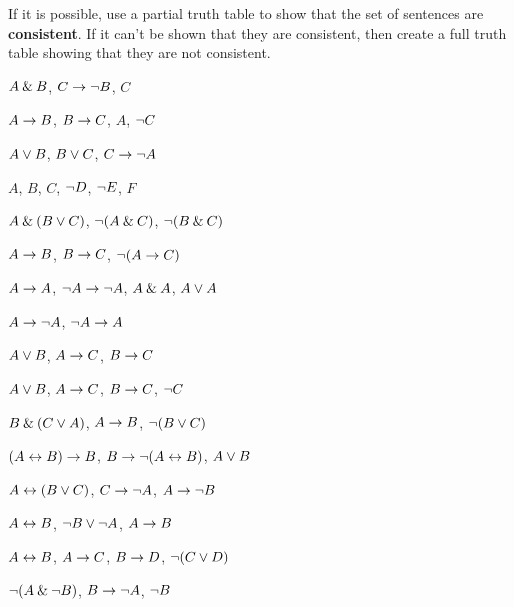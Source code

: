 \problempart
\label{pr.TT.consistent4}
If it is possible, use a partial truth table to show that the set of sentences are \textbf{consistent}. If it can't be shown that they are consistent, then create a full truth table showing that they are not consistent.
\begin{earg}
\item $A \mathbin{\&} B$, $C\rightarrow {\neg} B$, $C$ %
\item $A\rightarrow B$, $B\rightarrow C$, $A$, ${\neg} C$ %
\item $A \vee B$, $B\vee C$, $C\rightarrow {\neg} A$ %
\item $A$, $B$, $C$, ${\neg} D$, ${\neg} E$, $F$ %
\item $A \mathbin{\&} (B \vee C)$, ${\neg}(A \mathbin{\&} C)$, ${\neg}(B \mathbin{\&} C)$ %
\item $A \rightarrow B$, $B \rightarrow C$, ${\neg}(A \rightarrow C)$ %
\item $A\rightarrow A$, ${\neg} A \rightarrow {\neg} A$, $A\mathbin{\&} A$, $A\vee A$ %
\item $A \rightarrow {\neg} A$, ${\neg} A \rightarrow A$%
\item $A\vee B$, $A\rightarrow C$, $B\rightarrow C$ %
\item $A \vee B$, $A \rightarrow C$, $B \rightarrow C$, ${\neg} C$ %
\item $B\mathbin{\&}(C\vee A)$, $A\rightarrow B$, ${\neg}(B\vee C)$  %
\item $(A \leftrightarrow B) \rightarrow B$,  $B \rightarrow {\neg} (A \leftrightarrow B)$, $A \vee B$  %
\item $A\leftrightarrow(B\vee C)$, $C\rightarrow {\neg} A$, $A\rightarrow {\neg} B$ %
\item  $A \leftrightarrow B$,  ${\neg} B \vee {\neg} A$,  $A \rightarrow  B$ %
\item $A \leftrightarrow B$, $A \rightarrow C$, $B \rightarrow D$, ${\neg}(C \vee D)$ %
\item ${\neg} (A \mathbin{\&} {\neg} B)$,  $B \rightarrow {\neg} A$, ${\neg} B$   %
\end{earg}


